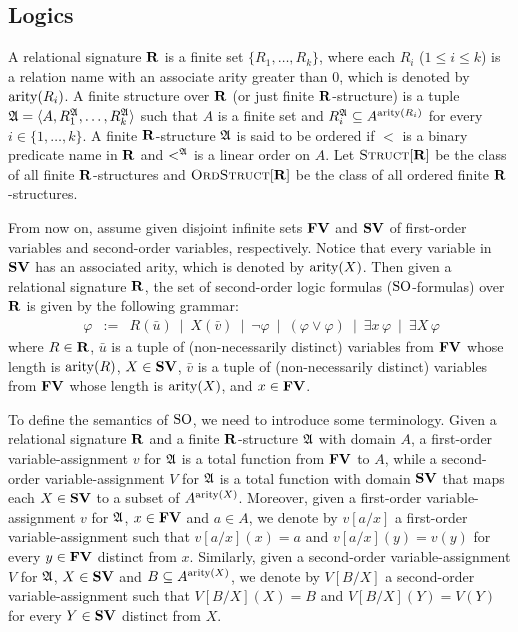 
\subsection{Logics}

A relational signature $\mathbf{R}$ is a finite set $\{R_1, \ldots, R_k\}$, where each $R_i$ ($1 \leq i \leq k$) is a relation name with an associate arity greater than 0, which is denoted by ${\rm arity}(R_i)$. A finite structure over $\mathbf{R}$ (or just finite $\mathbf{R}$-structure) is a tuple $\mathfrak{A} = \langle A, R_1^{\mathfrak{A}}, \ldots, R_k^{\mathfrak{A}} \rangle$ such that $A$ is a finite set and $R_i^{\mathfrak{A}} \subseteq A^{{\rm arity}(R_i)}$ for every $i \in \{1, \ldots, k\}$. A finite $\mathbf{R}$-structure $\mathfrak{A}$ is said to be ordered if $<$ is a binary predicate name in $\mathbf{R}$ and $<^{\mathfrak{A}}$ is a linear order on $A$. Let $\text{\sc Struct}[\mathbf{R}]$ be the class of all finite $\mathbf{R}$-structures and $\text{\sc OrdStruct}[\mathbf{R}]$ be the class of all ordered finite $\mathbf{R}$-structures. 

From now on, assume given disjoint infinite sets $\mathbf{FV}$ and $\mathbf{SV}$ of first-order variables and second-order variables, respectively. Notice that every variable in $\mathbf{SV}$ has an associated arity, which is denoted by ${\rm arity}(X)$. Then given a relational signature $\mathbf{R}$, the set of second-order logic formulas (${\rm SO}$-formulas) over $\mathbf{R}$ is given by the following grammar:
\begin{eqnarray*}\ 
\varphi &:=& R(\bar u) \ \mid\  
X(\bar v)  \ \mid\ 
\neg \varphi \ \mid\ 
(\varphi \vee \varphi) \ \mid\ 
\exists x \, \varphi \ \mid\ 
\exists X \, \varphi
\end{eqnarray*}
where $R \in \mathbf{R}$, $\bar u$ is a tuple of (non-necessarily distinct) variables from $\mathbf{FV}$ whose length is ${\rm arity}(R)$, $X \in \mathbf{SV}$, $\bar v$ is a tuple of (non-necessarily distinct) variables from $\mathbf{FV}$ whose length is ${\rm arity}(X)$, and $x \in \mathbf{FV}$. 

To define the semantics of ${\rm SO}$, we need to introduce some terminology. Given a relational signature $\mathbf{R}$ and a finite $\mathbf{R}$-structure $\mathfrak{A}$ with domain $A$, a first-order variable-assignment $v$ for $\mathfrak{A}$ is a total function from $\mathbf{FV}$ to $A$, while a second-order variable-assignment $V$ for $\mathfrak{A}$ is a total function with domain $\mathbf{SV}$ that maps each $X \in \mathbf{SV}$ to a subset of $A^{{\rm arity}(X)}$. Moreover, given a first-order variable-assignment $v$ for $\mathfrak{A}$, $x \in \mathbf{FV}$ and $a \in A$, we denote by $v[a/x]$ a first-order variable-assignment such that $v[a/x](x) = a$ and $v[a/x](y) = v(y)$ for every $y \in \mathbf{FV}$ distinct from $x$. Similarly, given a second-order variable-assignment $V$ for $\mathfrak{A}$, $X \in \mathbf{SV}$ and $B  \subseteq A^{{\rm arity}(X)}$, we denote by $V[B/X]$ a second-order variable-assignment such that $V[B/X](X) = B$ and $V[B/X](Y) = V(Y)$ for every $Y \in \mathbf{SV}$ distinct from $X$. 

